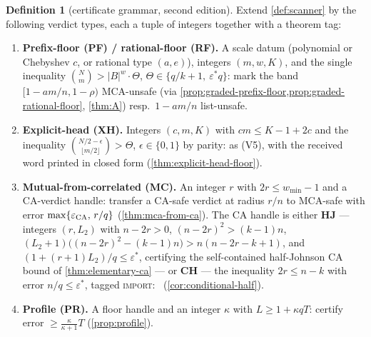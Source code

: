 \documentclass[11pt]{article}
\theoremstyle{definition}
\newtheorem{definition}[theorem]{Definition}
\theoremstyle{remark}
\newcommand{\B}{B}
\begin{document}
\begin{definition}[certificate grammar, second edition]\label{def:certificate-v2}
Extend \cref{def:scanner} by the following verdict types, each a tuple of integers together with a theorem tag:
\begin{enumerate}[label=\textup{(V\arabic*)},leftmargin=2.6em,start=5]
\item \textbf{Prefix-floor \textup(PF\textup) / rational-floor \textup(RF\textup).} A scale datum \textup(polynomial or Chebyshev $c$, or rational type $(a,e)$\textup), integers $(m,w,K)$, and the single inequality $\binom Nm>|\B|^w\cdot\Theta$, $\Theta\in\{q/k+1,\ \varepsilon^*q\}$: mark the band $[1-am/n,1-\rho)$ MCA-unsafe \textup(via \cref{prop:graded-prefix-floor,prop:graded-rational-floor}, \cref{thm:A}\textup) resp.\ $1-am/n$ list-unsafe.
\item \textbf{Explicit-head \textup(XH\textup).} Integers $(c,m,K)$ with $cm\le K-1+2c$ and the inequality $\binom{N/2-\epsilon}{\lfloor m/2\rfloor}>\Theta$, $\epsilon\in\{0,1\}$ by parity: as \textup{(V5)}, with the received word printed in closed form \textup(\cref{thm:explicit-head-floor}\textup).
\item \textbf{Mutual-from-correlated \textup(MC\textup).} An integer $r$ with $2r\le w_{\min}-1$ and a CA-verdict handle: transfer a CA-safe verdict at radius $r/n$ to MCA-safe with error $\max\{\varepsilon_{\rm CA},\,r/q\}$ \textup(\cref{thm:mca-from-ca}\textup). The CA handle is either \textbf{HJ} --- integers $(r,L_2)$ with $n-2r>0$, $(n-2r)^2>(k-1)n$, $(L_2+1)\bigl((n-2r)^2-(k-1)n\bigr)>n(n-2r-k+1)$, and $(1+(r+1)L_2)/q\le\varepsilon^*$, certifying the self-contained half-Johnson CA bound of \cref{thm:elementary-ca} --- or \textbf{CH} --- the inequality $2r\le n-k$ with error $n/q\le\varepsilon^*$, tagged \textup{\textsc{import}}:~\cite[Thm.~4.1]{BCIKS20} \textup(\cref{cor:conditional-half}\textup).
\item \textbf{Profile \textup(PR\textup).} A floor handle and an integer $\kappa$ with $L\ge1+\kappa q T$: certify error $\ge\frac{\kappa}{\kappa+1}T$ \textup(\cref{prop:profile}\textup).
\end{enumerate}
\end{definition}
\end{document}
